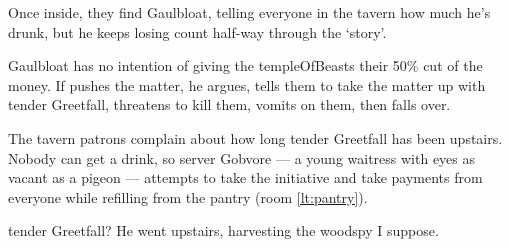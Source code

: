 \documentclass[10pt,twoside]{book}
\begin{document}
Once inside, they find Gaulbloat, telling everyone in the tavern how much he's drunk, but he keeps losing count half-way through the `story'.

Gaulbloat has no intention of giving the \gls{templeOfBeasts} their 50\% cut of the money.
If  pushes the matter, he argues, tells them to take the matter up with \gls{tender} Greetfall, threatens to kill them, vomits on them, then falls over.

The tavern patrons complain about how long \gls{tender} Greetfall has been upstairs.
Nobody can get a drink, so \gls{server} Gobvore --- a young waitress with eyes as vacant as a pigeon --- attempts to take the initiative and take payments from everyone while refilling from the pantry (room \vref{lt:pantry}).

\begin{speechtext}
  \Gls{tender} Greetfall?
  He went upstairs, \gls{harvesting} the \gls{woodspy} I suppose.
\end{speechtext}

\end{document}

